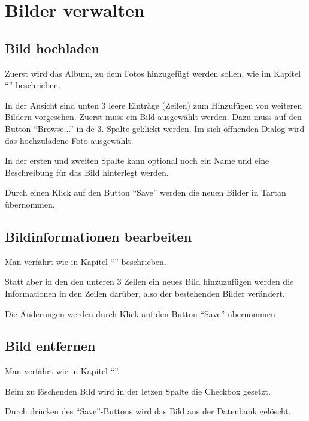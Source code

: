 \section{Bilder verwalten}
\subsection{Bild hochladen}
\label{subsec:uploadPic}
Zuerst wird das Album, zu dem Fotos hinzugefügt werden sollen, wie im Kapitel \enquote{} beschrieben.

In der Ansicht sind unten 3 leere Einträge (Zeilen) zum Hinzufügen von weiteren Bildern vorgesehen.
Zuerst muss ein Bild ausgewählt werden. Dazu muss auf den Button \enquote{Browse...} in de 3. Spalte geklickt werden. Im sich öffnenden Dialog wird das hochzuladene Foto ausgewählt.

In der ersten und zweiten Spalte kann optional noch ein Name und eine Beschreibung für das Bild hinterlegt werden.

Durch einen Klick auf den Button \enquote{Save} werden die neuen Bilder in Tartan übernommen.

\subsection{Bildinformationen bearbeiten}
\label{subsec:modPic}
Man verfährt wie in Kapitel \enquote{} beschrieben.

Statt aber in den den unteren 3 Zeilen ein neues Bild hinzuzufügen werden die Informationen in den Zeilen darüber, also der bestehenden Bilder verändert.

Die Änderungen werden durch Klick auf den Button \enquote{Save} übernommen

\subsection{Bild entfernen}
Man verfährt wie in Kapitel \enquote{}.

Beim zu löschenden Bild wird in der letzen Spalte die Checkbox gesetzt.

Durch drücken des \enquote{Save}-Buttons wird das Bild aus der Datenbank gelöscht.